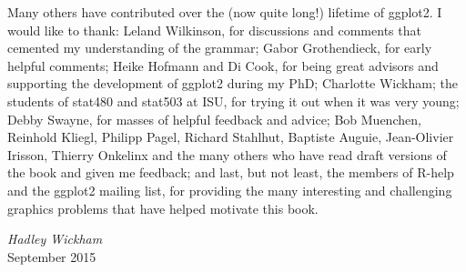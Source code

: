 Many others have contributed over the (now quite long!) lifetime of
ggplot2. I would like to thank: Leland Wilkinson, for discussions and
comments that cemented my understanding of the grammar; Gabor
Grothendieck, for early helpful comments; Heike Hofmann and Di Cook, for
being great advisors and supporting the development of ggplot2 during my
PhD; Charlotte Wickham; the students of stat480 and stat503 at ISU, for
trying it out when it was very young; Debby Swayne, for masses of
helpful feedback and advice; Bob Muenchen, Reinhold Kliegl, Philipp
Pagel, Richard Stahlhut, Baptiste Auguie, Jean-Olivier Irisson, Thierry
Onkelinx and the many others who have read draft versions of the book
and given me feedback; and last, but not least, the members of R-help
and the ggplot2 mailing list, for providing the many interesting and
challenging graphics problems that have helped motivate this book.

\vspace{\baselineskip}\begin{flushright}\noindent
{\it Hadley Wickham}\\
September 2015\\
\end{flushright}
